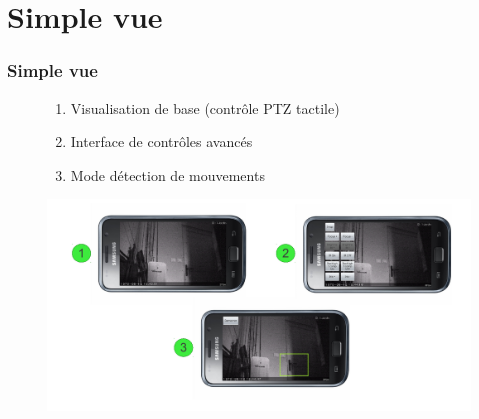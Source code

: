 
\section{Simple vue}
  \begin{frame}
   \frametitle{Simple vue}


\begin{figure}[H]
  \centering
     \begin{enumerate}
    \item Visualisation de base (contrôle PTZ tactile)
    \item Interface de contrôles avancés
    \item Mode détection de mouvements
   \end{enumerate}
   \includegraphics[scale=0.25]{Images/ImageSlide6.pdf}
  \end{figure}  

  \end{frame}
